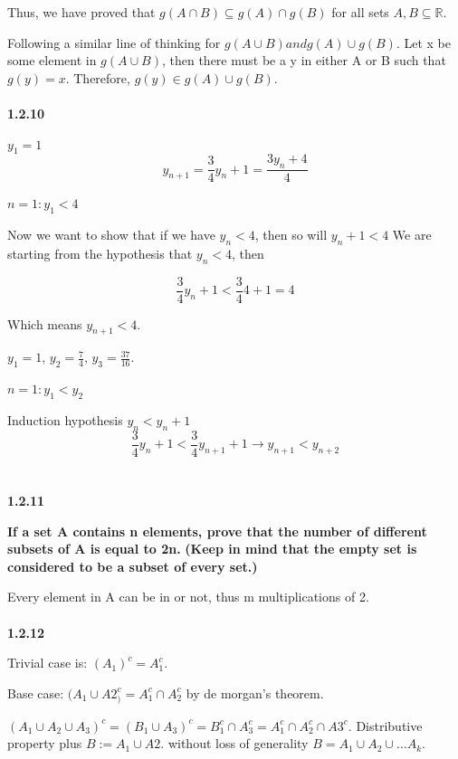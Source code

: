 Thus, we have proved that $g(A \cap B) \subseteq g(A) \cap g(B)$ for all sets $A, B \subseteq \mathbb{R}$.

Following a similar line of thinking for $g(A \cup B) and g(A) \cup g(B)$.
Let x be some element in $g(A \cup B)$, then there must be a y in either A or B such that $g(y) = x$.
Therefore, $g(y) \in g(A) \cup g(B)$.
\\~\\



\textbf{1.2.10}

$y_1 = 1$
$$
y_{n+1} = \frac{3}{4} y_n + 1 = \frac{3y_n + 4}{4}
$$

$n=1: y_1 < 4$

Now we want to show that if we have $y_n < 4$, then so will $y_n+1 < 4$
We are starting from the hypothesis that $y_n < 4$, then

$$
\frac{3}{4} y_n + 1 < \frac{3}{4} 4 + 1 = 4
$$

Which means $y_{n+1} < 4$.

$y_1 = 1$, $y_2 = \frac{7}{4}$, $y_3 = \frac{37}{16}$.

$n=1: y_1 < y_2$

Induction hypothesis $y_n < y_n+1$
$$
\frac{3}{4}  y_n + 1 < \frac{3}{4}  y_{n+1} + 1 \rightarrow y_{n+1} < y_{n+2}
$$
\\~\\



\textbf{1.2.11}

\textbf{If a set A contains n elements, prove that the number of different subsets of A is equal to 2n.}
\textbf{(Keep in mind that the empty set is considered to be a subset of every set.)}

Every element in A can be in or not, thus m multiplications of 2.
\\~\\


\textbf{1.2.12}

Trivial case is: $(A_1)^c  = A_1^c$.

Base case: $(A_1 \cup A2_)^c = A_1^c \cap A_2^c$ by de morgan’s theorem.

$(A_1 \cup A_2 \cup A_3)^c = (B_1 \cup A_3)^c = B_1^c \cap A_3^c = A_1^c \cap A_2^c \cap A3^c$.
Distributive property plus $B := A_1 \cup A2$. 
without loss of generality $B = A_1 \cup A_2 \cup \dots A_k$.
\\~\\



